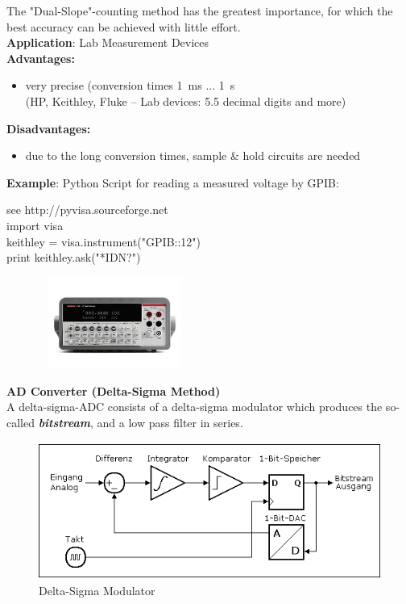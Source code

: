 The "Dual-Slope"-counting method has the greatest importance, for which the best accuracy can be achieved with little effort.\\

\textbf{Application}: Lab Measurement Devices\\

\textbf{Advantages:  }

\begin{itemize}
\item very precise (conversion times 1~ms ... 1~s \\
(HP, Keithley, Fluke -- Lab devices: 5.5 decimal digits and more)
\end{itemize}

\textbf{Disadvantages:  }

\begin{itemize}
\item due to the long conversion times, sample \& hold circuits are needed
\end{itemize}

\textbf{Example}: Python Script for reading a measured voltage by GPIB:

\begin{tcolorbox}[colback=blue!5!white,colframe=blue!75!black]
see http://pyvisa.sourceforge.net\\
import visa\\
keithley = visa.instrument("GPIB::12")\\
print keithley.ask("*IDN?") 
\end{tcolorbox}

    \begin{figure}[h]
    \centering
    \includegraphics[width=5cm, height=3cm]{Images/image40.png}
    \label{fig:Fig }
    \end{figure}
\newpage

{\rot\bf AD Converter (Delta-Sigma Method)}\\

A delta-sigma-ADC consists of a delta-sigma modulator which produces the so-called \textbf{\textit{bitstream}}, and a low pass filter in series.

    \begin{figure}[h]
    \centering
    \includegraphics[width=12cm, height=4.5cm]{Images/image41.png}
    \caption{Delta-Sigma Modulator}
    \label{fig:Fig }
    \end{figure}

